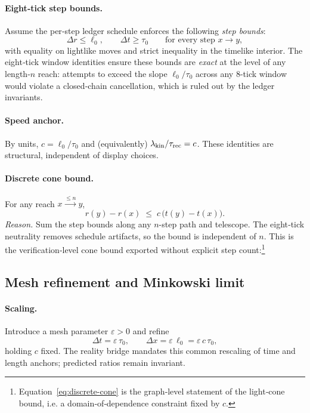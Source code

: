 \documentclass[12pt,a4paper]{article}
\theoremstyle{definition}
\theoremstyle{remark}
\begin{document}
\paragraph{Eight‑tick step bounds.}
Assume the per‑step ledger schedule enforces the following \emph{step bounds}:
\[
\Delta r \le \ell_0,\qquad \Delta t \ge \tau_0\qquad\text{for every step } x\to y,
\]
with equality on lightlike moves and strict inequality in the timelike interior. The eight‑tick window identities ensure these bounds are \emph{exact} at the level of any length‑\(n\) reach: attempts to exceed the slope \(\ell_0/\tau_0\) across any \(8\)-tick window would violate a closed‑chain cancellation, which is ruled out by the ledger invariants.

\paragraph{Speed anchor.}
By units, \(c=\ell_0/\tau_0\) and (equivalently) \(\lambda_{\rm kin}/\tau_{\rm rec}=c\). These identities are structural, independent of display choices.

\paragraph{Discrete cone bound.}
For any reach \(x \stackrel{\le n}{\longrightarrow} y\),
\begin{equation}\label{eq:discrete-cone}
r(y)-r(x)\;\le\; c\,\bigl(t(y)-t(x)\bigr).
\end{equation}
\emph{Reason.} Sum the step bounds along any \(n\)-step path and telescope. The eight‑tick neutrality removes schedule artifacts, so the bound is independent of \(n\). This is the verification‑level cone bound exported without explicit step count:\footnote{Equation~\eqref{eq:discrete-cone} is the graph‑level statement of the light‑cone bound, i.e. a domain‑of‑dependence constraint fixed by \(c\).}

\subsection{Mesh refinement and Minkowski limit}
\paragraph{Scaling.}
Introduce a mesh parameter \(\varepsilon>0\) and refine
\[
\Delta t=\varepsilon\,\tau_0,\qquad \Delta x=\varepsilon\,\ell_0=\varepsilon\, c\,\tau_0,
\]
holding \(c\) fixed. The reality bridge mandates this common rescaling of time and length anchors; predicted ratios remain invariant.
\end{document}

